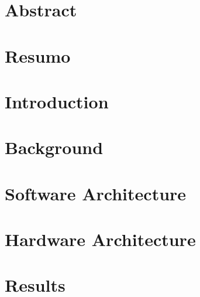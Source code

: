 \documentclass[10pt]{esda}
\begin{document}
\cleardoublepage
\section*{Abstract}


\vfill

\section*{}


\cleardoublepage
\section*{Resumo}


\vfill

\section*{}


\cleardoublepage
\tableofcontents
\cleardoublepage
\listoftables
\cleardoublepage
\listoffigures

\cleardoublepage


\cleardoublepage
\section{Introduction}
\label{sec:intro}


\cleardoublepage
\section{Background}
\label{sec:back}


\cleardoublepage
\section{Software Architecture}
\label{sec:sw}


\cleardoublepage
\section{Hardware Architecture}
\label{sec:hw}


\cleardoublepage
\section{Results}
\label{sec:results}

\end{document}
